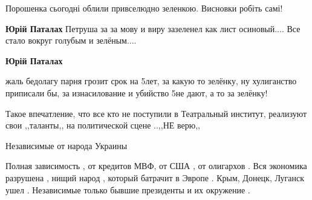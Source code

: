 \begin{itemize}
Порошенка сьогодні облили привселюдно зеленкою. Висновки робіть самі!

\begin{itemize}
 
\textbf{Юрій Паталах} Петруша за за мову и виру зазеленел как лист осиновый.... Все стало вокруг голубым и зелёным....

 
\textbf{Юрій Паталах} 

жаль бедолагу парня грозит срок на 5лет, за какую то зелёнку, ну хулиганство
приписали бы, за изнасилование и убийство 5не дают, а то за зелёнку!

\end{itemize}

 

Такое впечатление, что все кто не поступили в Театральный институт, реализуют
свои ,,таланты,, на политической сцене ..,,НЕ верю,,


 
Независимые от народа Украины

 

Полная зависимость , от кредитов МВФ, от США , от олигархов . Вся экономика
разрушена , нищий народ , который батрачит в Эвропе . Крым, Донецк, Луганск
ушел . Независимые только бывшие президенты и их окружение .


\end{itemize}
